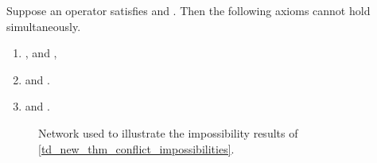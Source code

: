 \begin{theorem}
    \label{td_new_thm_conflict_impossibilities}
    Suppose an operator satisfies \symmetry{} and \claimcoherence{}. Then the
    following axioms cannot hold simultaneously.
    \begin{enumerate}
        \item \freshposresp{}, \sourcecoherence{} and \conflictcoherence{},
        \item \sourceposresp{} and \conflictcoherence{}.
        \item \sourceposresp{} and \anticoherence{}.
    \end{enumerate}
\end{theorem}

\begin{figure}
    \centering
    \caption{
        Network used to illustrate the impossibility results of
        \cref{td_new_thm_conflict_impossibilities}.
    }
    \label{td_new_fig_conflict_impossibilities}
\end{figure}

